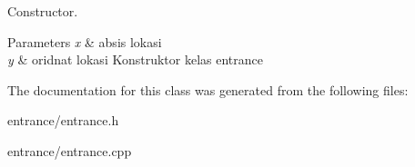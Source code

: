 Constructor. 


\begin{DoxyParams}{Parameters}
{\em x} & absis lokasi \\
\hline
{\em y} & oridnat lokasi Konstruktor kelas entrance \\
\hline
\end{DoxyParams}


The documentation for this class was generated from the following files\+:\begin{DoxyCompactItemize}
\item 
entrance/entrance.\+h\item 
entrance/entrance.\+cpp\end{DoxyCompactItemize}
